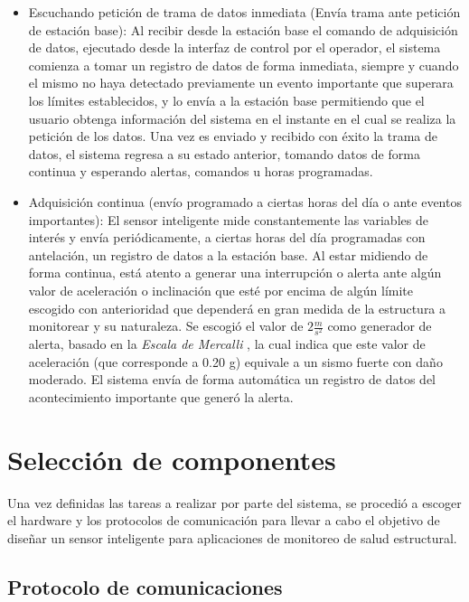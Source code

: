 \begin{itemize}
	\item Escuchando petición de trama de datos inmediata (Envía trama ante petición de estación base): Al recibir desde la estación base el comando de adquisición de datos, ejecutado desde la interfaz de control por el operador, el sistema comienza a tomar un registro de datos de forma inmediata, siempre y cuando el mismo no haya detectado previamente un evento importante que superara los límites establecidos, y lo envía a la estación base permitiendo que el usuario obtenga información del sistema en el instante en el cual se realiza la petición de los datos. Una vez es enviado y recibido con éxito la trama de datos, el sistema regresa a su estado anterior, tomando datos de forma continua y esperando alertas, comandos u horas programadas.
    \item Adquisición continua (envío programado a ciertas horas del día o ante eventos importantes): El sensor inteligente mide constantemente las variables de interés y envía periódicamente, a ciertas horas del día programadas con antelación, un registro de datos a la estación base. Al estar midiendo de forma continua, está atento a generar una interrupción o alerta ante algún valor de aceleración o inclinación que esté por encima de algún límite escogido con anterioridad que dependerá en gran medida de la estructura a monitorear y su naturaleza. Se escogió el valor de $2 \frac{m}{s^2}$ como generador de alerta, basado en la \textit{Escala de Mercalli} \citep{mercalli}, la cual indica que este valor de aceleración (que corresponde a 0.20 g) equivale a un sismo fuerte con daño moderado. El sistema envía de forma automática un registro de datos del acontecimiento importante que generó la alerta.

\end{itemize}

\section{Selección de componentes}
\label{sec:componentes}

Una vez definidas las tareas a realizar por parte del sistema, se procedió a escoger el hardware y los protocolos de comunicación para llevar a cabo el objetivo de diseñar un sensor inteligente para aplicaciones de monitoreo de salud estructural. 
	
\subsection{Protocolo de comunicaciones}

